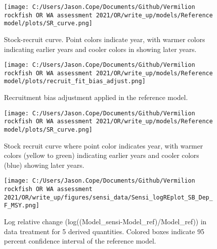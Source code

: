 \documentclass[11pt,
  english,
  a4paper,
]{article}
\begin{document}
\begin{figure}
\centering
\texttt{[image: C:/Users/Jason.Cope/Documents/Github/Vermilion rockfish OR WA assessment 2021/OR/write\_up/models/Reference model/plots/SR\_curve.png]}
\caption{Stock-recruit curve. Point colors indicate year, with warmer colors indicating earlier years and cooler colors in showing later years.\label{fig:bh-curve}}
\end{figure}

\tagmcend\tagstructend


\begin{figure}
\centering
\texttt{[image: C:/Users/Jason.Cope/Documents/Github/Vermilion rockfish OR WA assessment 2021/OR/write\_up/models/Reference model/plots/recruit\_fit\_bias\_adjust.png]}
\caption{Recruitment bias adjustment applied in the reference model.\label{fig:bias-adj}}
\end{figure}

\tagmcend\tagstructend


\begin{figure}
\centering
\texttt{[image: C:/Users/Jason.Cope/Documents/Github/Vermilion rockfish OR WA assessment 2021/OR/write\_up/models/Reference model/plots/SR\_curve.png]}
\caption{Stock recruit curve where point color indicates year, with warmer colors (yellow to green) indicating earlier years and cooler colors (blue) showing later years.\label{fig:sr-curve}}
\end{figure}

\tagmcend\tagstructend


\begin{figure}
\centering
\texttt{[image: C:/Users/Jason.Cope/Documents/Github/Vermilion rockfish OR WA assessment 2021/OR/write\_up/figures/sensi\_data/Sensi\_logREplot\_SB\_Dep\_F\_MSY.png]}
\caption{Log relative change (log((Model\_sensi-Model\_ref)/Model\_ref)) in data treatment for 5 derived quantities. Colored boxes indicate 95 percent confidence interval of the reference model.\label{fig:sensi-data-RE}}
\end{figure}
\end{document}
